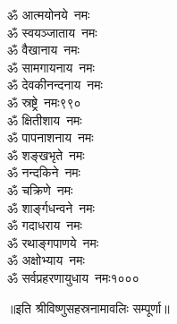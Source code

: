 \begin{multicols}{2}
\begin{flushleft}
ॐ आत्मयोनये~नमः\\
ॐ स्वयञ्जाताय~नमः\\
ॐ वैखानाय~नमः\\
ॐ सामगायनाय~नमः\\
ॐ देवकीनन्दनाय~नमः\\
ॐ स्रष्ट्रे~नमः\hfill ९९०\\
ॐ क्षितीशाय~नमः\\
ॐ पापनाशनाय~नमः\\
ॐ शङ्खभृते~नमः\\
ॐ नन्दकिने~नमः\\
ॐ चक्रिणे~नमः\\
ॐ शार्ङ्गधन्वने~नमः\\
ॐ गदाधराय~नमः\\
ॐ रथाङ्गपाणये~नमः\\
ॐ अक्षोभ्याय~नमः\\
ॐ सर्वप्रहरणायुधाय~नमः\hfill १०००
\end{flushleft}
\end{multicols}
\centerline{॥इति श्रीविष्णुसहस्रनामावलिः सम्पूर्णा॥}